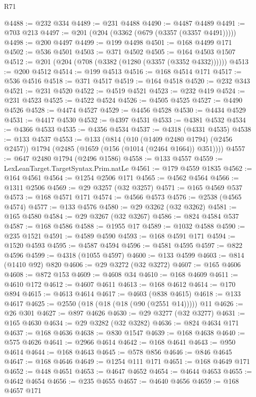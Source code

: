 \begin{lexlean}{R71}
\begin{coremodule}
@4488 := @232 @334
@4489 := @231 @4488
@4490 := @4487 @4489
@4491 := @703 @213
@4497 := @201 (@204 (@3362 (@679 (@3357 (@3357 @4491)))))
@4498 := @200 @4497
@4499 := @199 @4498
@4501 := @168 @4499 @171
@4502 := @536 @4501
@4503 := @371 @4502
@4505 := @164 @4503 @1507
@4512 := @201 (@204 (@708 (@3382 (@1280 (@3357 (@3352 @4332))))))
@4513 := @200 @4512
@4514 := @199 @4513
@4516 := @168 @4514 @171
@4517 := @536 @4516
@4518 := @371 @4517
@4519 := @164 @4518
@4520 := @232 @343
@4521 := @231 @4520
@4522 := @4519 @4521
@4523 := @232 @419
@4524 := @231 @4523
@4525 := @4522 @4524
@4526 := @4505 @4525
@4527 := @4490 @4526
@4528 := @4474 @4527
@4529 := @4456 @4528
@4530 := @4434 @4529
@4531 := @4417 @4530
@4532 := @4397 @4531
@4533 := @4381 @4532
@4534 := @4366 @4533
@4535 := @4356 @4534
@4537 := @4318 (@4331 @4535)
@4538 := @133 @4537
@4553 := @133
    (@814
      (@10 (@1409 @2480 @1794) (@2456 @2457))
      @1794
      (@2485 (@1659 (@156 (@1014 (@2464 @1664)) @351))))
@4557 := @647 @2480 @1794 (@2496 @1586)
@4558 := @133 @4557
@4559 := LexLeanTarget.TargetSyntax.Prim.natLe
@4561 := @179 @4559 @1835
@4562 := @164 @4561
@4564 := @1254 @2506 @171
@4565 := @4562 @4564
@4566 := @1311 @2506
@4569 := @29 @3257 (@32 @3257)
@4571 := @165 @4569 @537
@4573 := @168 @4571 @171
@4574 := @4566 @4573
@4576 := @2538 (@4565 @4574)
@4577 := @133 @4576
@4580 := @29 @3262 (@32 @3262)
@4581 := @165 @4580
@4584 := @29 @3267 (@32 @3267)
@4586 := @824 @4584 @537
@4587 := @168 @4586
@4588 := @1955 @17
@4589 := @1032 @4588
@4590 := @235 @1521
@4591 := @4589 @4590
@4593 := @168 @4591 @171
@4594 := @1520 @4593
@4595 := @4587 @4594
@4596 := @4581 @4595
@4597 := @822 @4596
@4599 := @4318 (@1055 @4597)
@4600 := @133 @4599
@4603 := @814 (@1410 @92) @820
@4606 := @29 @3272 (@32 @3272)
@4607 := @165 @4606
@4608 := @872 @153
@4609 := @4608 @34
@4610 := @168 @4609
@4611 := @4610 @172
@4612 := @4607 @4611
@4613 := @168 @4612
@4614 := @170 @894
@4615 := @4613 @4614
@4617 := @4603 (@838 @4615)
@4618 := @133 @4617
@4625 := @2550 (@18 (@18 (@18 (@90 (@2551 @14))))) @11
@4626 := @26 @301
@4627 := @897 @4626
@4630 := @29 @3277 (@32 @3277)
@4631 := @165 @4630
@4634 := @29 @3282 (@32 @3282)
@4636 := @824 @4634 @171
@4637 := @168 @4636
@4638 := @830 @1547
@4639 := @168 @4638
@4640 := @575 @4626
@4641 := @2966 @4614
@4642 := @168 @4641
@4643 := @950 @4614
@4644 := @168 @4643
@4645 := @578 @856
@4646 := @846 @4645
@4647 := @168 @4646
@4649 := @1254 @111 @171
@4651 := @168 @4649 @171
@4652 := @448 @4651
@4653 := @4647 @4652
@4654 := @4644 @4653
@4655 := @4642 @4654
@4656 := @235 @4655
@4657 := @4640 @4656
@4659 := @168 @4657 @171

\end{coremodule}
\end{lexlean}
